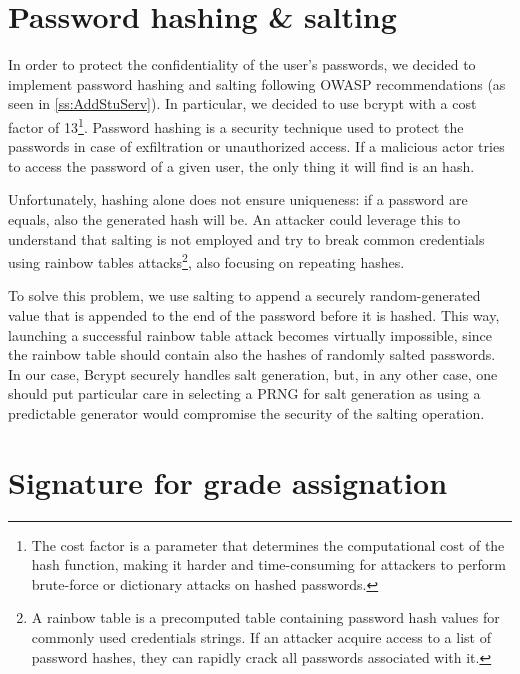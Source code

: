 \newpage
\section{Password hashing \& salting}

In order to protect the confidentiality of the user's passwords, we decided to implement password hashing and salting following OWASP recommendations (as seen in \autoref{ss:AddStuServ}). In particular, we decided to use bcrypt with a cost factor of 13\footnote{The cost factor is a parameter that determines the computational cost of the hash function, making it harder and time-consuming for attackers to perform brute-force or dictionary attacks on hashed passwords.}.
Password hashing is a security technique used to protect the passwords in case of exfiltration or unauthorized access. If a malicious actor tries to access the password of a given user, the only thing it will find is an hash.

Unfortunately, hashing alone does not ensure uniqueness: if a password are equals, also the generated hash will be. An attacker could leverage this to understand that salting is not employed and try to break common credentials using rainbow tables attacks\footnote{A rainbow table is a precomputed table containing password hash values for commonly used credentials strings. If an attacker acquire access to a list of password hashes, they can rapidly crack all passwords associated with it.}, also focusing on repeating hashes.

To solve this problem, we use salting to append a securely random-generated value that is appended to the end of the password before it is hashed. This way, launching a successful rainbow table attack becomes virtually impossible, since the rainbow table should contain also the hashes of randomly salted passwords. In our case, Bcrypt securely handles salt generation, but, in any other case, one should put particular care in selecting a PRNG for salt generation as using a predictable generator would compromise the security of the salting operation.

\section{Signature for grade assignation}

